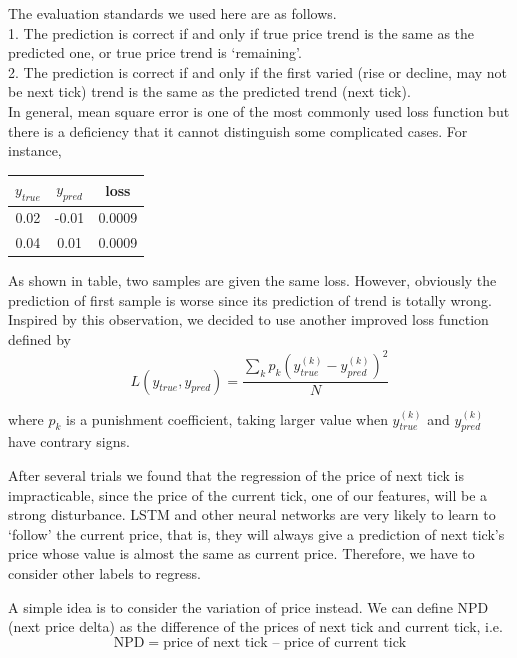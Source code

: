 \documentclass[10pt, conference, compsocconf]{IEEEtran}
\begin{document}
The evaluation standards we used here are as follows.\\

1. The prediction is correct if and only if true price trend is the same as the predicted one, or true price trend is ‘remaining’. \\
2. The prediction is correct if and only if the first varied (rise or decline, may not be next tick) trend is the same as the predicted trend (next tick).\\

In general, mean square error is one of the most commonly used loss function but there is a deficiency that it cannot distinguish some complicated cases. For instance, \\
\begin{center}
\begin{tabular}{|c|c|c|}
	\hline
	$y_{true}$ & $y_{pred}$ & loss\\
	\hline
	0.02 & -0.01 & 0.0009\\
	\hline
	0.04 & 0.01 & 0.0009\\
	\hline
\end{tabular}
\end{center}

As shown in table, two samples are given the same loss. However, obviously the prediction of first sample is worse since its prediction of trend is totally wrong. Inspired by this observation, we decided to use another improved loss
function defined by
$$
	L(y_{true},y_{pred}) = \frac{\sum_{k}p_k(y_{true}^{(k)} - y_{pred}^{(k)})^2}{N}
$$

where $p_k$ is a punishment coefficient, taking larger value when $y_{true}^{(k)}$ and $y_{pred}^{(k)}$ have contrary signs. 

After several trials we found that the regression of the price of next tick is impracticable, since the price of the current tick, one of our features, will be a strong disturbance. LSTM and other neural networks are very likely to 
learn to ‘follow’ the current price, that is, they will always give a prediction of next tick’s price whose value is almost the same as current price. Therefore, we have to consider other labels to regress. 

A simple idea is to consider the variation of price instead. We can define NPD (next price delta) as the difference of the prices of next tick and current tick, i.e.\\
$$
	\text{NPD} = \text{price of next tick } – \text{ price of current tick}
$$
\end{document}
